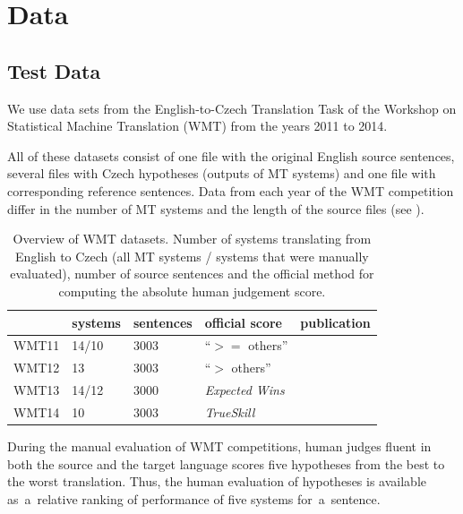 \chapter{Data}
\label{data}

\section{Test Data}

We use data sets from the English-to-Czech Translation Task of the Workshop on
Statistical Machine Translation (WMT) from the years 2011 to 2014.

All of these datasets consist of one file with the original English source sentences,
several files with Czech hypotheses (outputs of MT systems) and one file with corresponding 
reference sentences. Data from each year of the WMT competition differ in the 
number of MT systems and the length of the source files (see ). 


\begin{table}[h]
\centering
\begin{tabular}{l|l|l|l|l}
      & systems & sentences & official score & publication\\
\hline
WMT11 & 14/10    & 3003      & “$ >= $ others”      & \cite{wmt11}  \\
WMT12 & 13          & 3003      & “$ > $ others”      & \cite{wmt12}  \\
WMT13 & 14/12    & 3000      & \textit{Expected Wins} & \cite{wmt13}  \\
WMT14 & 10          & 3003      & \textit{TrueSkill}   & \cite{wmt14}
\end{tabular}
\caption{Overview of WMT datasets. Number of systems translating from English 
to Czech (all MT systems / systems that were manually evaluated), number of 
source sentences and the official method for computing the absolute human 
judgement score.}
\label{wmt-data}
\end{table}

During the manual evaluation of WMT competitions, human judges fluent in both
the source and the target language scores five hypotheses from the best to
the worst translation. Thus, the human evaluation of hypotheses is available 
as~a~relative ranking of performance of five systems for~a~sentence. 

